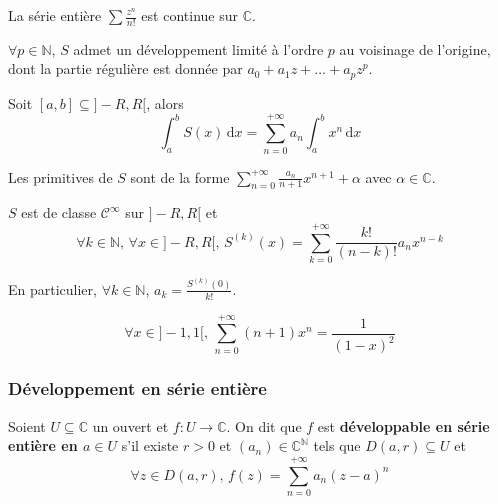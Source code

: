   \begin{example}
    La série entière $\sum \frac{z^n}{n!}$ est continue sur $\mathbb{C}$.
  \end{example}

  \begin{corollary}
    $\forall p \in \mathbb{N}$, $S$ admet un développement limité à l'ordre $p$ au voisinage de l'origine, dont la partie régulière est donnée par $a_0 + a_1z + \dots + a_pz^p$.
  \end{corollary}

  \begin{proposition}
    Soit $[a, b] \subseteq ]-R, R[$, alors
    \[ \int_{a}^{b} S(x) \, \mathrm{d}x = \sum_{n=0}^{+\infty} a_n \int_{a}^{b} x^n \, \mathrm{d}x \]
  \end{proposition}

  \begin{corollary}
    Les primitives de $S$ sont de la forme $\sum_{n=0}^{+\infty} \frac{a_n}{n+1} x^{n+1} + \alpha$ avec $\alpha \in \mathbb{C}$.
  \end{corollary}

  \begin{proposition}
    $S$ est de classe $\mathcal{C}^\infty$ sur $]-R,R[$ et
    \[ \forall k \in \mathbb{N}, \, \forall x \in ]-R,R[, \, S^{(k)}(x) = \sum_{k = 0}^{+\infty} \frac{k!}{(n-k)!} a_n x^{n-k} \]
  \end{proposition}

  \begin{remark}
    En particulier, $\forall k \in \mathbb{N}$, $a_k = \frac{S^{(k)}(0)}{k!}$.
  \end{remark}

  \begin{example}
    \[ \forall x \in ]-1, 1[, \, \sum_{n=0}^{+\infty} (n+1)x^n = \frac{1}{(1-x)^2} \]
  \end{example}

  \subsubsection{Développement en série entière}


  \begin{definition}
    Soient $U \subseteq \mathbb{C}$ un ouvert et $f : U \rightarrow \mathbb{C}$. On dit que $f$ est \textbf{développable en série entière en $a \in U$} s'il existe $r > 0$ et $(a_n) \in \mathbb{C}^{\mathbb{N}}$ tels que $D(a, r) \subseteq U$ et
    \[ \forall z \in D(a, r), \, f(z) = \sum_{n=0}^{+\infty} a_n (z-a)^n \]
  \end{definition}

